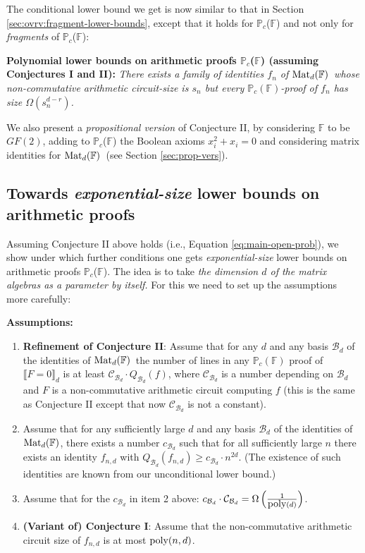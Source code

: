 \documentclass[12pt,reqno]{article}
\newcommand\F{\ensuremath{\mathbb F}}
\newcommand\PP{{\mathbb P}}
\newcommand\PC{\ensuremath{\PP_c}}
\newcommand{\poly}{\hbox{poly}}
\newcommand{\cd}{\cdot}
\newcommand {\ind} {\noindent}
\newcommand{\matd}{{\ensuremath{{\rm Mat}_d(\F)}}}
\begin{document}
\medskip



The conditional lower bound we get is now similar to that in Section \ref{sec:ovrv:fragment-lower-bounds}, except that it holds for \PC(\F) and not only for \textit{fragments} of \PC(\F):
\bigskip

\ind\textbf{Polynomial lower bounds on arithmetic proofs \PC(\F) (assuming Conjectures I and II):} \textit{There exists a family of identities $f_n$ of \matd\ whose non-commutative arithmetic circuit-size is $s_n$ but every $\PC(\F)$-proof of $f_n$ has size  $\Omega(s_n^{d-r})$.}
\bigskip

We also present a   \emph{propositional version} of Conjecture II, by  considering $\F$ to be $GF(2)$, adding to \PC(\F) the Boolean axioms $x_i^2+x_i=0$ and considering matrix identities for \matd\ (see Section \ref{sec:prop-vers}).



\subsection{Towards \textit {exponential-size} lower bounds on arithmetic proofs}

Assuming Conjecture II above holds (i.e., Equation \ref{eq:main-open-prob}), we show under which further conditions one gets \emph{exponential-size} lower bounds on arithmetic proofs \PC(\F).
The idea is  to take \textit{the dimension $d$ of the matrix algebras as a parameter by itself.}
For this we need to set up the assumptions more carefully:\bigskip


\ind\textbf{Assumptions:}

\begin{enumerate}

\item \textbf{Refinement of Conjecture II}: Assume that for any $d$ and any basis $\mathcal B_d$ of the identities of \matd\ the number of lines in any $\PC(\F)$ proof of $\llbracket F= 0\rrbracket_d$ is at least  $\mathcal C_{\mathcal B_d}\cd Q_{\mathcal B_d}(f)$, where $\mathcal C_{\mathcal B_d}$ is a number depending on \(\mathcal B_{d}\)  and $F$ is a non-commutative arithmetic circuit computing $f$ (this is the same as Conjecture II except that now $\mathcal C_{\mathcal B_d}$ is not a constant).


\item Assume that for any sufficiently large $d$ and any basis $\mathcal B_d$ of the identities of \matd, there exists a number $c_{\mathcal B_d}$ such that for all sufficiently large \(n\) there exists an identity $f_{n,d}$ with  $Q_{\mathcal B_d}(f_{n,d})\ge c_{\mathcal B_d}\cd n^{2d}$. (The existence of such identities are known from our unconditional lower bound.)

\item Assume that for the \(c_{\mathcal B_{d}}\) in item 2 above:   $c_{\mathcal B_d}\cd \mathcal C_{\mathcal B_d}= \Omega\left(\frac{1}{\poly(d)}\right)$.

\item \textbf{(Variant of) Conjecture I}: Assume that the non-commutative arithmetic circuit size of $f_{n,d}$ is  at most $\poly(n,d)$.
\end{enumerate}
\end{document}
